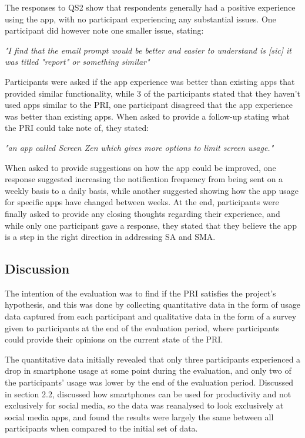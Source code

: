 \documentclass[12pt]{article}
\begin{document}
The responses to QS2 show that respondents generally had a positive experience using the app, with no participant experiencing any substantial issues. One
participant did however note one smaller issue, stating:\newline

\textit{"I find that the email prompt would be better and easier to understand is [sic] it was titled "report" or something similar"}\newline

Participants were asked if the app experience was better than existing apps that provided similar functionality, while 3 of the participants stated that they haven't
used apps similar to the PRI, one participant disagreed that the app experience was better than existing apps. When asked to provide a follow-up stating what the PRI
could take note of, they stated:\newline

\textit{"an app called Screen Zen which gives more options to limit screen usage."}\newline

When asked to provide suggestions on how the app could be improved, one response suggested increasing the notification frequency from being sent on a weekly basis
to a daily basis, while another suggested showing how the app usage for specific apps have changed between weeks. At the end, participants were finally asked to
provide any closing thoughts regarding their experience, and while only one participant gave a response, they stated that they believe the app is a step in the 
right direction in addressing SA and SMA.


\subsection{Discussion}
The intention of the evaluation was to find if the PRI satisfies the project's hypothesis, and this was done by collecting quantitative data in the form of usage data captured
from each participant and qualitative data in the form of a survey given to participants at the end of the evaluation period, where participants could provide their opinions on the
current state of the PRI. \newline

The quantitative data initially revealed that only three participants experienced a drop in smartphone usage at some point during the evaluation, and only two 
of the participants' usage was lower by the end of the evaluation period. Discussed in section 2.2, \textcite{RefWorks:RefID:35-dosselaar2017smartphone} discussed how smartphones can be used 
for productivity and not exclusively for social media, so the data was reanalysed to look exclusively at social media apps, and found the results were largely the same between all participants when compared to
the initial set of data.\newline
\end{document}
